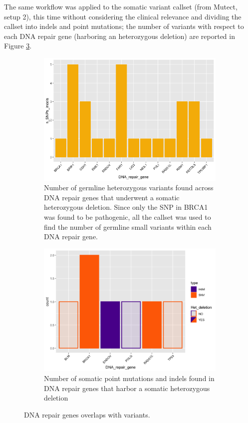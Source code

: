 \documentclass[11pt]{article}
\begin{document}
The same workflow was applied to the somatic variant callset (from Mutect, setup 2), this time without considering the clinical relevance and dividing the callset into indels and point mutations; the number of variants with respect to each DNA repair gene (harboring an heterozygous deletion) are reported in Figure \ref{somatic_dna_repair}. 

\begin{figure}[H]
\centering
\begin{subfigure}{.47\textwidth}
    \centering
    \includegraphics[width=\linewidth]{images/overlap_germline.png}
    \caption{\label{germline_dna_repair}\footnotesize{Number of germline heterozygous variants found across DNA repair genes that underwent a somatic heterozygous deletion. Since only the SNP in BRCA1 was found to be pathogenic, all the callset was used to find the number of germline small variants within each DNA repair gene.}}
\end{subfigure}
\hfill                      
\begin{subfigure}{.47\textwidth}
    \centering
    \includegraphics[width=\linewidth]{images/overlap_somatic.png}
    \caption{\label{somatic_dna_repair}\footnotesize{Number of somatic point mutations and indels found in DNA repair genes that harbor a somatic heterozygous deletion}}
\end{subfigure}
\caption{\footnotesize{DNA repair genes overlaps with variants.}}
\end{figure}
\end{document}
